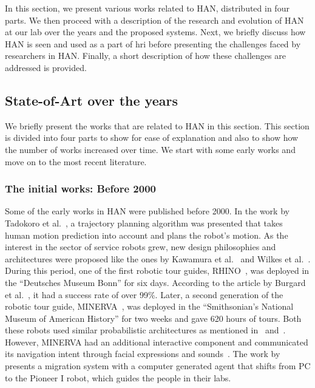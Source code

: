 In this section, we present various works related to HAN, distributed in four parts. We then proceed with a description of the research and evolution of HAN at our lab over the years and the proposed systems. Next, we briefly discuss how HAN is seen and used as a part of \acrshort{hri} before presenting the challenges faced by researchers in HAN. Finally, a short description of how these challenges are addressed is provided. 

\subsection{State-of-Art over the years}
We briefly present the works that are related to HAN in this section. This section is divided into four parts to show for ease of explanation and also to show how the number of works increased over time. We start with some early works and move on to the most recent literature. 

\subsubsection{The initial works: Before 2000}
Some of the early works in HAN were published before 2000. In the work by Tadokoro et al.~\cite{tadokoro1995motion}, a trajectory planning algorithm was presented that takes human motion prediction into account and plans the robot's motion. As the interest in the sector of service robots grew, new design philosophies and architectures were proposed like the ones by Kawamura et al.~\cite{kawamura1996design} and Wilkes et al.~\cite{wilkes1998toward}. During this period, one of the first robotic tour guides, RHINO~\cite{burgard1999museum}, was deployed in the “Deutsches Museum Bonn” for six days. According to the article by Burgard et al.~\cite{burgard1999experiences}, it had a success rate of over 99\%. Later, a second generation of the robotic tour guide, MINERVA~\cite{thrun1999minerva}, was deployed in the “Smithsonian’s National Museum of American History” for two weeks and gave 620 hours of tours. Both these robots used similar probabilistic architectures as mentioned in~\cite{burgard1999experiences} and~\cite{thrun2000probabilistic}. However, MINERVA had an additional interactive component and communicated its navigation intent through facial expressions and sounds~\cite{schulte1999spontaneous}. The work by~\cite{imai1999agent} presents a migration system with a computer generated agent that shifts from PC to the Pioneer I robot, which guides the people in their labs.

